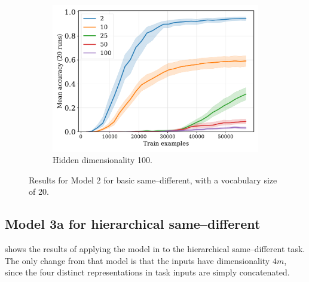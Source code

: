 \begin{figure}[H]
  \begin{subfigure}{0.45\linewidth}
    \includegraphics[width=1\textwidth]{../fig/fuzzy-lm-vocab20-pretrain-3tasks-train_size-embed_dim-hidden_dim=100.pdf}
    \caption{Hidden dimensionality 100.}
    \label{fig:model2-rep}
  \end{subfigure}

  \caption{Results for Model 2 for basic same--different, with a vocabulary size of 20.}
  \label{fig:model2}
\end{figure}


\newpage


\subsection{Model 3a for hierarchical same--different}\label{app:model1-premack}

 shows the results of applying the model in  to the hierarchical same--different task. The only change from that model is that the inputs have dimensionality $4m$, since the four distinct representations in task inputs are simply concatenated.


